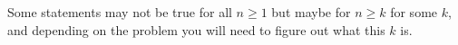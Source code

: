 \documentclass[11pt,dvipsnames]{book}
\numberwithin{figure}{section} %
\numberwithin{table}{section} %
\begin{document}
%
%
%

Some statements may not be true for all $n\geq 1$ but maybe for $n\geq k$ for some $k$, and depending on the problem you will need to figure out what this $k$ is.


%

%

\end{document}
